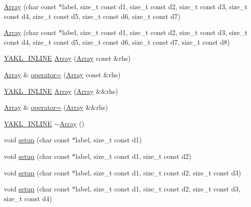 \begin{DoxyCompactItemize}
\item 
\hyperlink{classyakl_1_1Array_aa442acadeba5bbaac00a2377f42d8d90}{Array} (char const $\ast$label, size\+\_\+t const d1, size\+\_\+t const d2, size\+\_\+t const d3, size\+\_\+t const d4, size\+\_\+t const d5, size\+\_\+t const d6, size\+\_\+t const d7)
\item 
\hyperlink{classyakl_1_1Array_a7ea13d5b470c370686995998e2b671af}{Array} (char const $\ast$label, size\+\_\+t const d1, size\+\_\+t const d2, size\+\_\+t const d3, size\+\_\+t const d4, size\+\_\+t const d5, size\+\_\+t const d6, size\+\_\+t const d7, size\+\_\+t const d8)
\item 
\hyperlink{YAKL_8h_aa0dd629ffce6d564b19e9313fb91a5ad}{Y\+A\+K\+L\+\_\+\+I\+N\+L\+I\+NE} \hyperlink{classyakl_1_1Array_aad63408156dbe13bd154110776ccf832}{Array} (\hyperlink{classyakl_1_1Array}{Array} const \&rhs)
\item 
\hyperlink{classyakl_1_1Array}{Array} \& \hyperlink{classyakl_1_1Array_a6691a891ce2de823d6b4d982e826802a}{operator=} (\hyperlink{classyakl_1_1Array}{Array} const \&rhs)
\item 
\hyperlink{YAKL_8h_aa0dd629ffce6d564b19e9313fb91a5ad}{Y\+A\+K\+L\+\_\+\+I\+N\+L\+I\+NE} \hyperlink{classyakl_1_1Array_ab0fa8146f38f9cf8a89240b781b2d4b6}{Array} (\hyperlink{classyakl_1_1Array}{Array} \&\&rhs)
\item 
\hyperlink{classyakl_1_1Array}{Array} \& \hyperlink{classyakl_1_1Array_a3fa976a468678ca9574f22dd00a2246c}{operator=} (\hyperlink{classyakl_1_1Array}{Array} \&\&rhs)
\item 
\hyperlink{YAKL_8h_aa0dd629ffce6d564b19e9313fb91a5ad}{Y\+A\+K\+L\+\_\+\+I\+N\+L\+I\+NE} \hyperlink{classyakl_1_1Array_ad678067305bc1488877f49362c6eb0f6}{$\sim$\+Array} ()
\item 
void \hyperlink{classyakl_1_1Array_ae917f79f12b290dcd8083233d1d799c4}{setup} (char const $\ast$label, size\+\_\+t const d1)
\item 
void \hyperlink{classyakl_1_1Array_a70c7126b0e020098de46dd7c296c6f24}{setup} (char const $\ast$label, size\+\_\+t const d1, size\+\_\+t const d2)
\item 
void \hyperlink{classyakl_1_1Array_a697987a31846b4705f56f00759c15a82}{setup} (char const $\ast$label, size\+\_\+t const d1, size\+\_\+t const d2, size\+\_\+t const d3)
\item 
void \hyperlink{classyakl_1_1Array_ae5ca69f311d52f2c30653d2d0a7d6e0d}{setup} (char const $\ast$label, size\+\_\+t const d1, size\+\_\+t const d2, size\+\_\+t const d3, size\+\_\+t const d4)
\item 

\end{DoxyCompactItemize}

